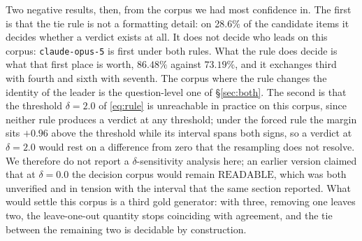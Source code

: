 \documentclass{article}
\newcommand{\ids}[1]{\texttt{\small #1}} %
\begin{document}
Two negative results, then, from the corpus we had most confidence in. The first is that the tie rule is not a formatting detail: on 28.6\% of the candidate items it decides whether a verdict exists at all. It does not decide who leads on this
corpus: \ids{claude-opus-5} is first under both rules. What the rule does decide is what that first place is worth,
$86.48\%$ against $73.19\%$, and it exchanges third with fourth and sixth with seventh. The corpus where the rule
changes the identity of the leader is the question-level one of \S\ref{sec:both}. The second is that the threshold $\delta = 2.0$ of \eqref{eq:rule} is unreachable in practice on this corpus, since neither rule produces a verdict at any threshold; under the forced rule the margin sits $+0.96$ above the threshold while its interval spans both signs, so a verdict at $\delta = 2.0$ would rest on a difference from zero that the resampling does not resolve. We therefore do not report a $\delta$-sensitivity analysis here; an earlier version claimed that at $\delta = 0.0$ the decision corpus would remain $\mathrm{READABLE}$, which was both unverified and in tension with the interval that the same section reported. What would settle this corpus is a third gold generator: with three, removing one leaves two, the leave-one-out quantity stops coinciding with agreement, and the tie between the remaining two is decidable by construction.
\end{document}
